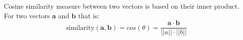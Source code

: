 \documentclass[conference]{IEEEtran}
\begin{document}
\enlargethispage{0.5cm} 
Cosine similarity measure between two vectors is based on their inner product. 
For two vectors $\boldsymbol{a}$ and $\boldsymbol{b}$ that is:
\begin{equation}
\mbox{similarity}(\boldsymbol{a},\boldsymbol{b}) = cos(\theta) = \frac{ 
\mathbf{a} \cdot \mathbf{b} } {\left| \left| a \right| \right| \cdot \left| \left| b \right|
\right|}
\end{equation} 

\end{document}
